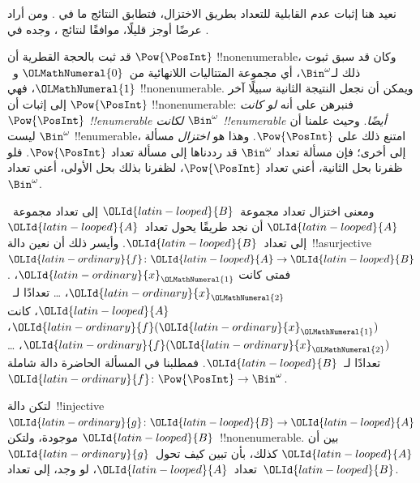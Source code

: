 \documentclass[../../../include/open-logic-section]{subfiles}
\begin{document}


\begin{editorial}
نعيد هنا إثبات عدم القابلية للتعداد بطريق الاختزال، فتطابق النتائج ما في . ومن أراد عرضًا أوجز قليلًا، موافقًا لنتائج ، وجده في .
\end{editorial}

قد ثبت بالحجة القطرية أن $\Pow{\PosInt}$ !!{nonenumerable}، وكان قد سبق ثبوت ذلك لـ$\Bin^\omega$، أي مجموعة المتتاليات اللانهائية من~$\OLMathNumeral{0}$ و~$\OLMathNumeral{1}$، فهي !!{nonenumerable}. ويمكن أن نجعل النتيجة الثانية سبيلًا آخر إلى إثبات أن $\Pow{\PosInt}$ !!{nonenumerable}: فنبرهن على أنه \emph{لو كانت $\Pow{\PosInt}$ !!{enumerable} لكانت $\Bin^\omega$ !!{enumerable} أيضًا}. وحيث علمنا أن $\Bin^\omega$ ليست !!{enumerable}، امتنع ذلك على $\Pow{\PosInt}$. وهذا هو \emph{اختزال} مسألة إلى أخرى؛ فإن مسألة تعداد $\Bin^\omega$ قد رددناها إلى مسألة تعداد $\Pow{\PosInt}$. فلو ظفرنا بحل الثانية، أعني تعداد $\Pow{\PosInt}$، لظفرنا بذلك بحل الأولى، أعني تعداد $\Bin^\omega$.

ومعنى اختزال تعداد مجموعة~$\OLId{latin-looped}{B}$ إلى تعداد مجموعة~$\OLId{latin-looped}{A}$ أن نجد طريقًا يحول تعداد~$\OLId{latin-looped}{A}$ إلى تعداد~$\OLId{latin-looped}{B}$. وأيسر ذلك أن نعين دالة~!!a{surjective} $\OLId{latin-ordinary}{f}\colon \OLId{latin-looped}{A} \to \OLId{latin-looped}{B}$. فمتى كانت $\OLId{latin-ordinary}{x}_\OLMathNumeral{1}$، $\OLId{latin-ordinary}{x}_\OLMathNumeral{2}$، \dots{} تعدادًا لـ~$\OLId{latin-looped}{A}$، كانت $\OLId{latin-ordinary}{f}(\OLId{latin-ordinary}{x}_\OLMathNumeral{1})$، $\OLId{latin-ordinary}{f}(\OLId{latin-ordinary}{x}_\OLMathNumeral{2})$، \dots{} تعدادًا لـ~$\OLId{latin-looped}{B}$. فمطلبنا في المسألة الحاضرة دالة شاملة $\OLId{latin-ordinary}{f}\colon \Pow{\PosInt} \to \Bin^\omega$.

\begin{prob}
لتكن دالة~!!{injective} $\OLId{latin-ordinary}{g}\colon \OLId{latin-looped}{B} \to \OLId{latin-looped}{A}$ موجودة، ولتكن $\OLId{latin-looped}{B}$~!!{nonenumerable}. بين أن $\OLId{latin-looped}{A}$ كذلك، بأن تبين كيف تحول~$\OLId{latin-ordinary}{g}$ تعداد~$\OLId{latin-looped}{A}$، لو وجد، إلى تعداد~$\OLId{latin-looped}{B}$.
\end{prob}
\end{document}
